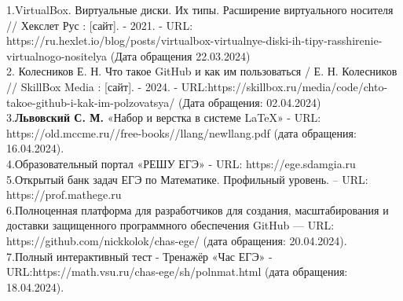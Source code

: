 1.\quad VirtualBox. Виртуальные диски. Их типы. Расширение виртуального носителя // Хекслет Рус : [сайт]. - 2021. - URL: https://ru.hexlet.io/blog/posts/virtualbox-virtualnye-diski-ih-tipy-rasshirenie-virtualnogo-nositelya (Дата обращения 22.03.2024)
\\ 2. \quad Колесников Е. Н. Что такое GitHub и как им пользоваться / Е. Н. Колесников // SkillBox Media : [сайт]. - 2024. - URL:https://skillbox.ru/media/code/chto-takoe-github-i-kak-im-polzovatsya/ (Дата обращения: 02.04.2024)
\\3.\quad \textbf{Львовский С. М.} «Набор и верстка в системе LaTeX» - URL: https://old.mccme.ru//free-books//llang/newllang.pdf (дата обращения: 16.04.2024).
\\4.\quad Образовательный портал «РЕШУ ЕГЭ» - URL: https://ege.sdamgia.ru 
\\5.\quad Открытый банк задач ЕГЭ по Математике. Профильный уровень. – URL: https://prof.mathege.ru
\\6.\quad Полноценная платформа для разработчиков для создания, масштабирования и доставки защищенного программного обеспечения GitHub — URL: https://github.com/nickkolok/chas-ege/ (дата обращения: 20.04.2024).  
\\7.\quad Полный интерактивный тест - Тренажёр «Час ЕГЭ» - URL:https://math.vsu.ru/chas-ege/sh/polnmat.html (дата обращения: 18.04.2024).